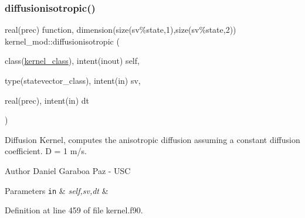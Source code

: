 \subsubsection{\texorpdfstring{diffusionisotropic()}{diffusionisotropic()}}
{\footnotesize\ttfamily real(prec) function, dimension(size(sv\%state,1),size(sv\%state,2)) kernel\+\_\+mod\+::diffusionisotropic (\begin{DoxyParamCaption}\item[{class(\mbox{\hyperlink{structkernel__mod_1_1kernel__class}{kernel\+\_\+class}}), intent(inout)}]{self,  }\item[{type(statevector\+\_\+class), intent(in)}]{sv,  }\item[{real(prec), intent(in)}]{dt }\end{DoxyParamCaption})}



Diffusion Kernel, computes the anisotropic diffusion assuming a constant diffusion coefficient. D = 1 m/s. 

\begin{DoxyAuthor}{Author}
Daniel Garaboa Paz -\/ U\+SC 
\end{DoxyAuthor}

\begin{DoxyParams}[1]{Parameters}
\mbox{\tt in}  & {\em self,sv,dt} & \\
\hline
\end{DoxyParams}


Definition at line 459 of file kernel.\+f90.


